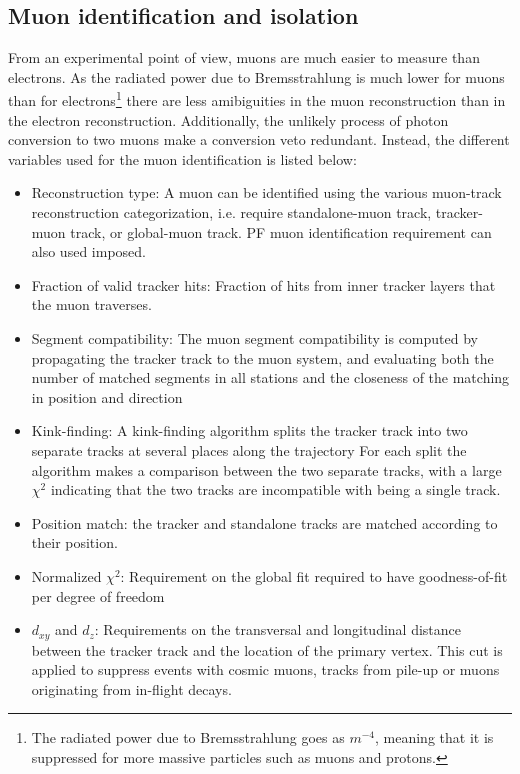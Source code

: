 \subsection{Muon identification and isolation}
From an experimental point of view, muons are much easier to measure than electrons. 
As the radiated power due to Bremsstrahlung is much lower for muons than for electrons\footnote{The radiated power due to Bremsstrahlung goes as $m^{-4}$, meaning that it is suppressed for more massive particles such as muons and protons.} there are less amibiguities in the muon reconstruction than in the electron reconstruction. 
Additionally, the unlikely process of photon conversion to two muons make a conversion veto redundant.   
Instead, the different variables used for the muon identification is listed below:
\begin{itemize}\addtolength{\itemsep}{0.5\baselineskip}
\item Reconstruction type: A muon can be identified using the various muon-track reconstruction categorization, i.e. require standalone-muon track, tracker-muon track, or global-muon track. PF muon identification requirement can also used imposed.
\item Fraction of valid tracker hits: Fraction of hits from inner tracker layers that the muon traverses.  
\item Segment compatibility: The muon segment compatibility is computed by propagating the tracker track to the muon system, and evaluating both the number of matched segments in all stations and the closeness of the matching in position and direction     
\item Kink-finding: A kink-finding algorithm splits the tracker track into two separate tracks at several places along the trajectory
For each split the algorithm makes a comparison between the two separate tracks, with a large $\chi^{2}$ indicating that the two tracks are incompatible with being a single track.
\item Position match: the tracker and standalone tracks are matched according to their position. 
\item Normalized $\chi^{2}$: Requirement on the global fit required to have goodness-of-fit per degree of freedom 
\item $d_{xy}$ and $d_{z}$: Requirements on the transversal and longitudinal distance between the tracker track and the location of the primary vertex. This cut is applied to suppress events with cosmic muons, tracks from pile-up or muons originating from in-flight decays.
\end{itemize}

